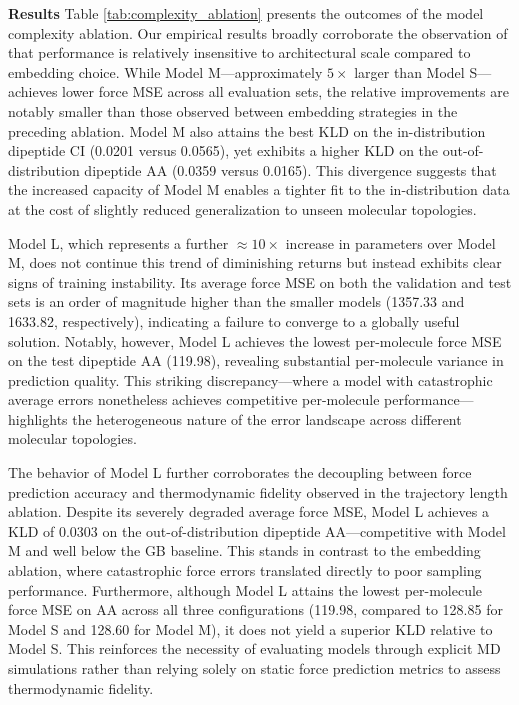 \textbf{Results}  Table \ref{tab:complexity_ablation} presents the outcomes of the model complexity ablation. Our empirical results broadly corroborate the observation of \citet{machine_learning_implicit_solvation} that performance is relatively insensitive to architectural scale compared to embedding choice. While Model M---approximately $5\times$ larger than Model S---achieves lower force MSE across all evaluation sets, the relative improvements are notably smaller than those observed between embedding strategies in the preceding ablation. Model M also attains the best KLD on the in-distribution dipeptide CI (0.0201 versus 0.0565), yet exhibits a higher KLD on the out-of-distribution dipeptide AA (0.0359 versus 0.0165). This divergence suggests that the increased capacity of Model M enables a tighter fit to the in-distribution data at the cost of slightly reduced generalization to unseen molecular topologies.

Model L, which represents a further $\approx$$10\times$ increase in parameters over Model M, does not continue this trend of diminishing returns but instead exhibits clear signs of training instability. Its average force MSE on both the validation and test sets is an order of magnitude higher than the smaller models (1357.33 and 1633.82, respectively), indicating a failure to converge to a globally useful solution. Notably, however, Model L achieves the lowest per-molecule force MSE on the test dipeptide AA (119.98), revealing substantial per-molecule variance in prediction quality. This striking discrepancy---where a model with catastrophic average errors nonetheless achieves competitive per-molecule performance---highlights the heterogeneous nature of the error landscape across different molecular topologies.

The behavior of Model L further corroborates the decoupling between force prediction accuracy and thermodynamic fidelity observed in the trajectory length ablation. Despite its severely degraded average force MSE, Model L achieves a KLD of 0.0303 on the out-of-distribution dipeptide AA---competitive with Model M and well below the GB baseline. This stands in contrast to the embedding ablation, where catastrophic force errors translated directly to poor sampling performance. Furthermore, although Model L attains the lowest per-molecule force MSE on AA across all three configurations (119.98, compared to 128.85 for Model S and 128.60 for Model M), it does not yield a superior KLD relative to Model S. This reinforces the necessity of evaluating models through explicit MD simulations rather than relying solely on static force prediction metrics to assess thermodynamic fidelity.

